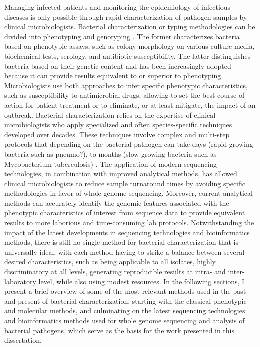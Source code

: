 Managing infected patients and monitoring the epidemiology of infectious diseases is only possible through rapid characterization of pathogen samples by clinical microbiologists. Bacterial characterization or typing methodologies can be divided into phenotyping and genotyping \cite{li_bacterial_2009}. The former characterizes bacteria based on phenotypic assays, such as colony morphology on various culture media, biochemical tests, serology, and antibiotic susceptibility. The latter distinguishes bacteria based on their genetic content and has been increasingly adopted because it can provide results equivalent to or superior to phenotyping. Microbiologists use both approaches to infer specific phenotypic characteristics, such as susceptibility to antimicrobial drugs, allowing to set the best course of action for patient treatment or to eliminate, or at least mitigate, the impact of an outbreak.
Bacterial characterization relies on the expertise of clinical microbiologists who apply specialized and often species-specific techniques developed over decades. These techniques involve complex and multi-step protocols that depending on the bacterial pathogen can take days (rapid-growing bacteria such as pneumo?), to months (slow-growing bacteria such as Mycobacterium tuberculosis) \cite{didelot_transforming_2012}. The application of modern sequencing technologies, in combination with improved analytical methods, has allowed clinical microbiologists to reduce sample turnaround times by avoiding specific methodologies in favor of whole genome sequencing. Moreover, current analytical methods can accurately identify the genomic features associated with the phenotypic characteristics of interest from sequence data to provide equivalent results to more laborious and time-consuming lab protocols. Notwithstanding the impact of the latest developments in sequencing technologies and bioinformatics methods, there is still no single method for bacterial characterization that is universally ideal, with each method having to strike a balance between several desired characteristics, such as being applicable to all isolates, highly discriminatory at all levels, generating reproducible results at intra- and inter-laboratory level, while also using modest resources.
In the following sections, I present a brief overview of some of the most relevant methods used in the past and present of bacterial characterization, starting with the classical phenotypic and molecular methods, and culminating on the latest sequencing technologies and bioinformatics methods used for whole genome sequencing and analysis of bacterial pathogens, which serve as the basis for the work presented in this dissertation.

